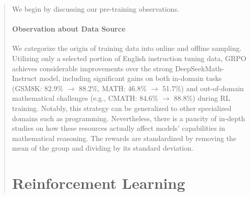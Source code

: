 \begin{abstract}
\begin{itemize}[topsep=0pt]
We begin by discussing our pre-training observations. \paragraph{Observation about Data Source} We categorize the origin of training data into online and offline sampling. Utilizing only a selected portion of English instruction tuning data, GRPO achieves considerable improvements over the strong DeepSeekMath-Instruct model, including significant gains on both in-domain tasks (GSM8K: 82.9\% $\rightarrow$ 88.2\%, MATH: 46.8\% $\rightarrow$ 51.7\%) and out-of-domain mathematical challenges (e.g., CMATH: 84.6\% $\rightarrow$ 88.8\%) during RL training. Notably, this strategy can be generalized to other specialized domains such as programming. Nevertheless, there is a paucity of in-depth studies on how these resources actually affect models’ capabilities in mathematical reasoning. The rewards are standardized by removing the mean of the group and dividing by its standard deviation. \section{Reinforcement Learning}


\end{itemize}
\end{abstract}
